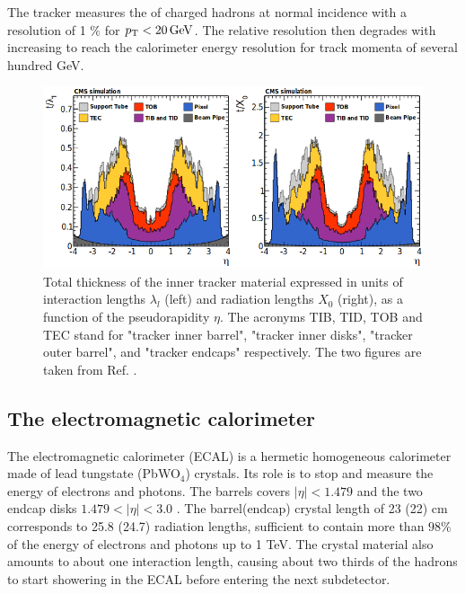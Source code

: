 The tracker measures the \pt of charged hadrons at normal incidence with a resolution of 1 $\%$ for $p_{\mathrm{T}} < 20\,\mathrm{GeV}$. The relative resolution then degrades with increasing \pt to reach the calorimeter energy resolution for track momenta of several hundred GeV.

\begin{figure}
    \centering
    \includegraphics[width=\textwidth]{Images/trackerthickness.png}
    \caption{Total thickness of the inner tracker material expressed in units of interaction lengths $\lambda_{l}$ (left) and radiation lengths $X_{0}$ (right), as a function of the pseudorapidity $\eta$. The acronyms TIB, TID, TOB and TEC stand for "tracker inner barrel", "tracker inner disks", "tracker outer barrel", and "tracker endcaps" respectively. The two figures are taken from Ref. \cite{Collaboration_2014}.}
    \label{fig:tracker_material}
\end{figure}

\subsection{The electromagnetic calorimeter}

The electromagnetic calorimeter (ECAL) \cite{CERN-LHCC-97-033,Bloch:581342} is a hermetic homogeneous calorimeter made of lead tungstate (PbWO$_4$) crystals. Its role is to stop and measure the energy of electrons and photons. The barrels covers $|\eta| < 1.479$ and the two endcap disks $1.479 < |\eta| < 3.0$ . The barrel(endcap) crystal length of 23 (22) cm corresponds to 25.8 (24.7) radiation lengths, sufficient to contain more than $98\%$ of the energy of electrons and photons up to 1 TeV. The crystal material also amounts to about one interaction length, causing about two thirds of the hadrons to start showering in the ECAL before entering the next subdetector.

